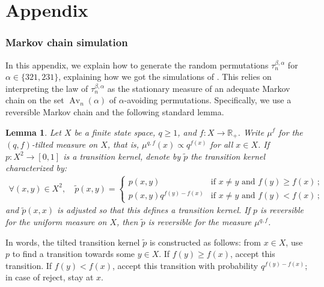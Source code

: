 \documentclass[a4paper,11pt]{amsart}
\newcommand{\R}{\mathbb R}
\DeclareMathOperator{\Av}{Av}
\newtheorem{lem}[thm]{Lemma}
\theoremstyle{definition}
\begin{document}



\appendix
\part{Appendix}
\section{Markov chain simulation}
\label{sec: simulations by reversible MC}

In this appendix, we explain how to generate the random permutations $\tau_n^{\beta, \alpha}$ for $\alpha\in\{321,231\}$, explaining how we got the simulations of .
This relies on interpreting the law of $\tau_n^{\beta, \alpha}$ as the stationary measure of an adequate Markov chain on the set $\Av_n(\alpha)$ of $\alpha$-avoiding permutations.
Specifically, we use a reversible Markov chain and the following standard lemma.

\begin{lem}
\label{lem: reversible and tilted MC}
    Let $X$ be a finite state space, $q\ge1$, and $f:X\to\R_+$.
    Write $\mu^f$ for the $(q,f)$-tilted measure on $X$, that is, $\mu^{q,f}(x) \propto q^{f(x)}$ for all $x\in X$.
    If $p : X^2 \to [0,1]$ is a transition kernel, denote by $\tilde p$ the transition kernel characterized by:
    \begin{align*}
        \forall (x,y)\in X^2,\quad
        \tilde p(x,y) = 
        \left\{
        \begin{array}{ll}
            p(x,y) & \text{if }x\ne y \text{ and }f(y)\ge f(x) \,;\\
            p(x,y)q^{f(y)-f(x)} & \text{if }x\ne y \text{ and }f(y)< f(x) \,;
        \end{array}
        \right.
    \end{align*}
    and $\tilde p(x,x)$ is adjusted so that this defines a transition kernel.
    If $p$ is reversible for the uniform measure on $X$, then $\tilde p$ is reversible for the measure $\mu^{q,f}$.
\end{lem}

In words, the tilted transition kernel $\tilde p$ is constructed as follows:
from $x\in X$, use $p$ to find a transition towards some $y\in X$.
If $f(y) \ge f(x)$, accept this transition.
If $f(y) < f(x)$, accept this transition with probability $q^{f(y)-f(x)}$; in case of reject, stay at $x$.
\end{document}
